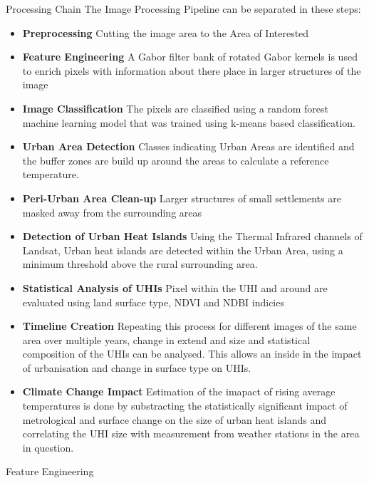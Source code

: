 \documentclass[final]{beamer}
\newlength{\colwidth}
\begin{document}
\begin{frame}[t]
\begin{columns}[t]
\begin{column}{\colwidth}
  \begin{exampleblock}{Processing Chain}
   The Image Processing Pipeline can be separated in these steps:
    \begin{itemize}
      \item \textbf{Preprocessing} Cutting the image area to the Area of Interested
      \item \textbf{Feature Engineering} A Gabor filter bank of rotated Gabor kernels is used to enrich pixels with information about there place in larger structures of the image
      \item \textbf{Image Classification}  The pixels are classified using a random forest machine learning model that was trained using k-means based classification. 
      \item \textbf{Urban Area Detection} Classes indicating Urban Areas are identified and the buffer zones are build up around the areas to calculate a reference temperature.
      \item \textbf{Peri-Urban Area Clean-up} Larger structures of small settlements are masked away from the surrounding areas
      \item \textbf{Detection of Urban Heat Islands} Using the Thermal Infrared channels of Landsat, Urban heat islands are detected within the Urban Area, using a minimum threshold above the rural surrounding area.
      \item \textbf{Statistical Analysis of UHIs} Pixel within the UHI and around are evaluated using land surface type, NDVI and NDBI indicies
      \item \textbf{Timeline Creation} Repeating this process for different images of the same area over multiple years, change in extend and size and statistical composition of the UHIs can be analysed. This allows an inside in the impact of urbanisation and change in surface type on UHIs.
      \item \textbf{Climate Change Impact} Estimation of the imapact of rising average temperatures is done by substracting the statistically significant impact of metrological and surface change on the size of urban heat islands and correlating the UHI size with measurement from weather stations in the area in question.
    \end{itemize}
  \end{exampleblock}

  \begin{block}{Feature Engineering}
    

\end{block}
\end{column}
\end{columns}
\end{frame}
\end{document}
